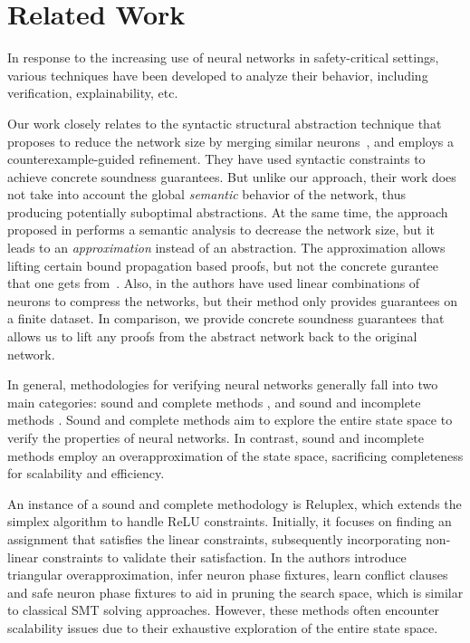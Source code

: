 \section{Related Work}

In response to the increasing use of neural networks in safety-critical settings, 
various techniques have been developed to analyze their behavior, including 
verification, explainability, etc. 

Our work closely relates to the syntactic structural abstraction technique that
proposes to reduce the network size by merging similar neurons~\cite{cegar-nn,
cegarette, cleverest-nn}, and employs a counterexample-guided refinement. They have used
syntactic constraints to achieve concrete soundness guarantees. But unlike our
approach, their work does not take into account the global \textit{semantic}
behavior of the network, thus producing potentially suboptimal abstractions.
At the same time, the approach proposed in \cite{deep-abstract} performs a
semantic analysis to decrease the network size, but it leads to an
\emph{approximation} instead of an abstraction. The approximation allows
lifting certain bound propagation based proofs, but not the concrete gurantee
that one gets from~\cite{cegar-nn}. Also, in \cite{lin-comb-abs-jan} the
authors have used linear combinations of neurons to compress the networks, but
their method only provides guarantees on a finite dataset. In comparison, we
provide concrete soundness guarantees that allows us to lift any proofs from
the abstract network back to the original network.

In general, methodologies for verifying neural networks generally fall into two
main categories: sound and complete methods \cite{reluplex,
    formal-ver-piece-wise, 
comp-reachability-analysis, comp-milp, comp-out-range, comp-max-resilience, marabou,
comp-safety-ver-dnn, beta-crown, alpha-crown-bab-fnc, gcp-crown}, and sound and
incomplete methods \cite{deeppoly, crown, incomp-dual-approach, incomp-abs-inp, 
incomp-robustness-certi, incomp-boost-robustness}. Sound and complete methods aim to 
explore the entire state space to verify the properties of neural networks.
In contrast, sound and incomplete methods employ an overapproximation
of the state space, sacrificing completeness for 
scalability and efficiency.

An instance of a sound and complete methodology is Reluplex, which extends the 
simplex algorithm \cite{simplex} to 
handle ReLU constraints. Initially, it focuses on finding an assignment that 
satisfies the linear constraints, subsequently incorporating non-linear constraints 
to validate their satisfaction. In \cite{formal-ver-piece-wise}
the authors introduce triangular overapproximation, infer neuron phase fixtures,
learn conflict clauses and safe neuron phase fixtures to aid in pruning the search 
space, which is similar to classical SMT solving approaches. However, these methods
often encounter scalability issues due to their exhaustive exploration of the
entire state space. 


